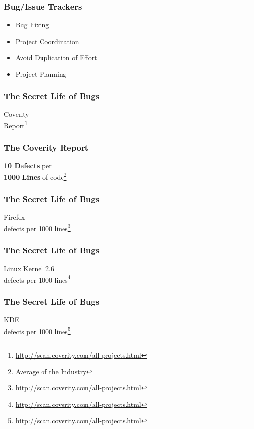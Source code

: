 \documentclass[18pt]{beamer}
\begin{document}
\begin{frame}
\frametitle{Bug/Issue Trackers}
\Huge
\begin{itemize}
\item Bug Fixing
\pause
\item Project Coordination
\pause
\item Avoid Duplication of Effort
\pause
\item Project Planning
\end{itemize}
\end{frame}


\begin{frame}
\frametitle{The Secret Life of Bugs}
\Huge
\begin{center}
Coverity\\
\bigskip
Report\footnote{\url{http://scan.coverity.com/all-projects.html}}
\end{center}
\end{frame}


\begin{frame}
\frametitle{The Coverity Report}
\Huge
\begin{center}
\textbf{10 Defects} per\\
\bigskip
\textbf{1000 Lines} of code\footnote{Average of the Industry}
\end{center}
\end{frame}

\begin{frame}
\frametitle{The Secret Life of Bugs}
\Huge
\begin{center}
Firefox\\
 defects per 1000 lines\footnote{\url{http://scan.coverity.com/all-projects.html}}
\end{center}
\end{frame}


\begin{frame}
\frametitle{The Secret Life of Bugs}
\Huge
\begin{center}
Linux Kernel 2.6\\
 defects per 1000 lines\footnote{\url{http://scan.coverity.com/all-projects.html}}

\end{center}
\end{frame}


\begin{frame}
\frametitle{The Secret Life of Bugs}
\Huge
\begin{center}
KDE\\
 defects per 1000 lines\footnote{\url{http://scan.coverity.com/all-projects.html}}
\end{center}
\end{frame}
\end{document}
